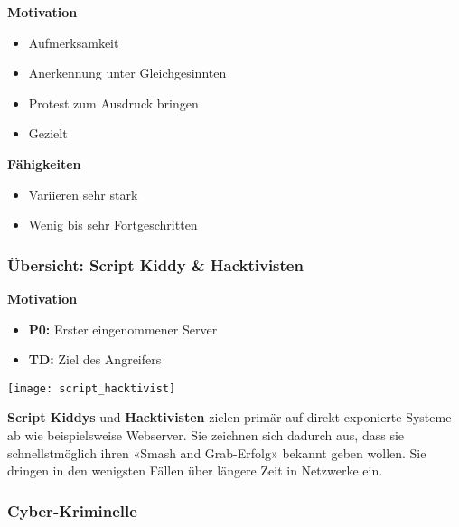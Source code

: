 \begin{minipage}{0.5\linewidth}
    \textbf{Motivation}
    \begin{itemize}
        \item Aufmerksamkeit
        \item Anerkennung unter Gleichgesinnten
        \item Protest zum Ausdruck bringen
        \item Gezielt\\
    \end{itemize}
\end{minipage}
\begin{minipage}{0.45\linewidth}
    \textbf{Fähigkeiten}\\
    \begin{itemize}
        \item Variieren sehr stark
        \item Wenig bis sehr Fortgeschritten
    \end{itemize}
\end{minipage}

\subsubsection{Übersicht: Script Kiddy \& Hacktivisten}

\begin{minipage}{0.5\linewidth}
    \textbf{Motivation}
    \begin{itemize}
        \item \textbf{P0:} Erster eingenommener Server
        \item \textbf{TD:} Ziel des Angreifers
    \end{itemize}
\end{minipage}
\begin{minipage}{0.5\linewidth}
    \texttt{[image: script\_hacktivist]}\\
\end{minipage}

\textbf{Script Kiddys} und \textbf{Hacktivisten} zielen primär auf direkt exponierte Systeme ab wie beispielsweise Webserver. Sie zeichnen sich dadurch aus, dass sie schnellstmöglich ihren «Smash and Grab-Erfolg» bekannt geben wollen. Sie dringen in den wenigsten Fällen über längere Zeit in Netzwerke ein.

\subsubsection{Cyber-Kriminelle}

